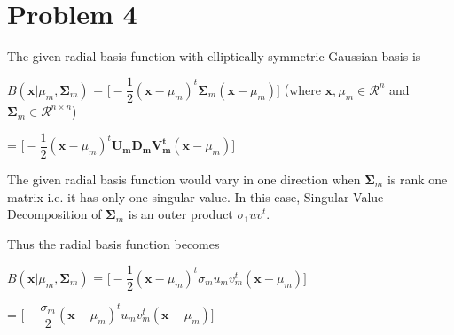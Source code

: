 \documentclass[11pt]{article}
\begin{document}
\begin{center}

\ \\
\end{center}

\section*{Problem 4}

\vspace{5 mm}
\noindent

The given radial basis function with elliptically symmetric Gaussian basis is

$B(\mathbf{x}|\mu_m,\boldsymbol \Sigma_m)$ 
=  $\bigg[  -\dfrac{1}{2}(\mathbf{x} - 
\mu_{m} )^t\boldsymbol \Sigma_m (\mathbf{x} - \mu_{m} )    \bigg]$
\text ({where $\mathbf{x}, \mu_{m}  \in \mathcal{R}^n$ and $\boldsymbol \Sigma_m \in  \mathcal{R}^{n \times n}$)}

= $\bigg[  -\dfrac{1}{2}(\mathbf{x} - 
\mu_{m} )^t\mathbf {U_mD_mV_m^t} (\mathbf{x} - \mu_{m} )    \bigg]$


\vspace{5 mm}
\noindent 
The given radial basis function would vary in one direction when $\boldsymbol \Sigma_m $ is rank one matrix 
i.e. it has only one singular value. 
In this case, Singular Value Decomposition of $\boldsymbol \Sigma_m $ is an outer product $\sigma_1uv^t$. 

Thus the radial basis function becomes 

$B(\mathbf{x}|\mu_m,\boldsymbol \Sigma_m)$ 
=  $\bigg[  -\dfrac{1}{2}(\mathbf{x} - 
\mu_{m} )^t\sigma_mu_mv_m^t (\mathbf{x} - \mu_{m} )    \bigg]$

=  $\bigg[  -\dfrac{\sigma_m}{2}(\mathbf{x} - 
\mu_{m} )^tu_mv_m^t (\mathbf{x} - \mu_{m} )    \bigg]$

\vspace{5 mm}
\noindent
\end{document}
